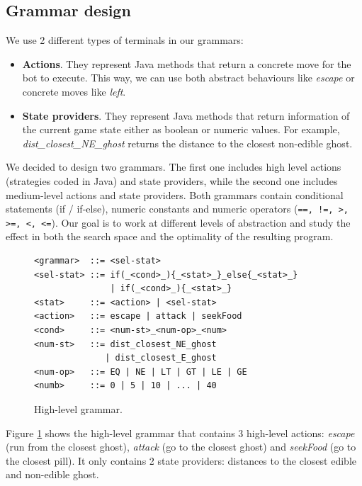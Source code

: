 \documentclass{llncs}
\begin{document}
\subsection{Grammar design}

We use 2 different types of terminals in our grammars:

\begin{itemize}
\item \textbf{Actions}. They represent Java methods that return a concrete move for the bot to execute. This way, we can use both abstract behaviours like \emph{escape} or concrete moves like \emph{left}.

\item \textbf{State providers}. They represent Java methods that return information of the current game state either as boolean or numeric values. For example, \emph{dist\_closest\_NE\_ghost} returns the distance to the closest non-edible ghost.
\end{itemize}

We decided to design two grammars. The first one includes high level actions (strategies coded in Java) and state providers, while the second one includes medium-level actions and state providers. Both grammars contain conditional statements (if / if-else), numeric constants and numeric operators (\texttt{==, !=, >, >=, <, <=}). Our goal is to work at different levels of abstraction and study the effect in both the search space and the optimality of the resulting program. 

\begin{figure}[tb]
	\centering
\begin{lstlisting}[frame=single, breaklines=false, basicstyle=\fontsize{10}{11}\ttfamily]
<grammar>  ::= <sel-stat>
<sel-stat> ::= if(_<cond>_){_<stat>_}_else{_<stat>_}
               | if(_<cond>_){_<stat>_}
<stat>     ::= <action> | <sel-stat>
<action>   ::= escape | attack | seekFood
<cond>     ::= <num-st>_<num-op>_<num>
<num-st>   ::= dist_closest_NE_ghost
              | dist_closest_E_ghost
<num-op>   ::= EQ | NE | LT | GT | LE | GE
<numb>     ::= 0 | 5 | 10 | ... | 40
\end{lstlisting} %
	\caption{High-level grammar.}
	\label{fig:hl-grammar}
\end{figure}

Figure \ref{fig:hl-grammar} shows the high-level grammar that contains 3 high-level actions: \emph{escape} (run from the closest ghost), \emph{attack} (go to the closest ghost) and \emph{seekFood} (go to the closest pill). It only contains 2 state providers: distances to the closest edible and non-edible ghost.
\end{document}
